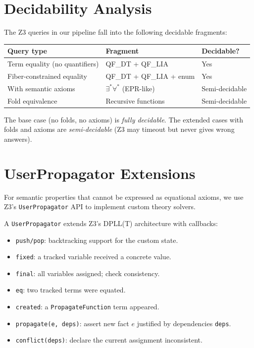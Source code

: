 \documentclass[11pt,a4paper]{report}
\theoremstyle{definition}
\theoremstyle{plain}
\begin{document}
\section{Decidability Analysis}

The Z3 queries in our pipeline fall into the following decidable
fragments:

\begin{center}
\begin{tabular}{l l l}
  \textbf{Query type} & \textbf{Fragment} & \textbf{Decidable?} \\
  \hline
  Term equality (no quantifiers) & QF\_DT + QF\_LIA & Yes \\
  Fiber-constrained equality & QF\_DT + QF\_LIA + enum & Yes \\
  With semantic axioms & $\exists^*\forall^*$ (EPR-like) & Semi-decidable \\
  Fold equivalence & Recursive functions & Semi-decidable \\
\end{tabular}
\end{center}

The base case (no folds, no axioms) is \emph{fully decidable}.  The
extended cases with folds and axioms are \emph{semi-decidable} (Z3 may
timeout but never gives wrong answers).

\section{UserPropagator Extensions}

For semantic properties that cannot be expressed as equational axioms,
we use Z3's \texttt{UserPropagator} API to implement custom theory
solvers.

A \texttt{UserPropagator} extends Z3's DPLL(T) architecture with
callbacks:
\begin{itemize}
  \item \texttt{push/pop}: backtracking support for the custom state.
  \item \texttt{fixed}: a tracked variable received a concrete value.
  \item \texttt{final}: all variables assigned; check consistency.
  \item \texttt{eq}: two tracked terms were equated.
  \item \texttt{created}: a \texttt{PropagateFunction} term appeared.
  \item \texttt{propagate(e, deps)}: assert new fact $e$ justified by
    dependencies \texttt{deps}.
  \item \texttt{conflict(deps)}: declare the current assignment
    inconsistent.
\end{itemize}
\end{document}
